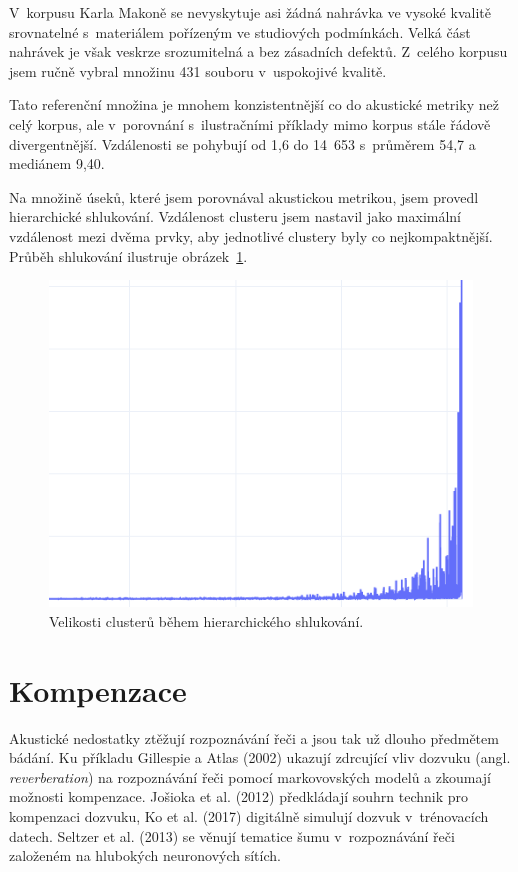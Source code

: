 V~korpusu Karla Makoně se nevyskytuje asi žádná nahrávka ve vysoké kvalitě
srovnatelné s~materiálem pořízeným ve studiových podmínkách. Velká část
nahrávek je však veskrze srozumitelná a bez zásadních defektů. Z~celého korpusu
jsem ručně vybral množinu 431 souboru v~uspokojivé kvalitě.

Tato referenční množina je mnohem konzistentnější co do akustické metriky než
celý korpus, ale v~porovnání s~ilustračními příklady mimo korpus stále řádově
divergentnější. Vzdálenosti se pohybují od 1,6 do 14~653 s~průměrem  54,7 a
mediánem 9,40.

Na množině úseků, které jsem porovnával akustickou metrikou, jsem provedl
hierarchické shlukování\cite{johnson1967hierarchical}. Vzdálenost clusteru jsem nastavil jako maximální
vzdálenost mezi dvěma prvky, aby jednotlivé clustery byly co nejkompaktnější.
Průběh shlukování ilustruje obrázek~\ref{fig:clustering}.

\begin{figure}[htpb]
\includegraphics[scale=0.8]{rc/clustering.png}
\caption{Velikosti clusterů během hierarchického shlukování.}
\label{fig:clustering}
\end{figure}

\section{Kompenzace}
\label{sec:akustika:kompenzace}

Akustické nedostatky ztěžují rozpoznávání řeči a jsou tak už dlouho předmětem
bádání. Ku příkladu Gillespie a Atlas (2002)\cite{gillespie2002diversity} ukazují
zdrcující vliv dozvuku (angl. {\em reverberation}) na rozpoznávání řeči pomocí
markovovských modelů a zkoumají možnosti kompenzace. Jošioka et
al. (2012)\cite{reverbmagazine} předkládají souhrn technik pro kompenzaci dozvuku, Ko
et al. (2017)\cite{reverbaugment} digitálně simulují dozvuk v~trénovacích datech.
Seltzer et al. (2013)\cite{dnnnoiserobust} se věnují tematice šumu v~rozpoznávání řeči
založeném na hlubokých neuronových sítích.

